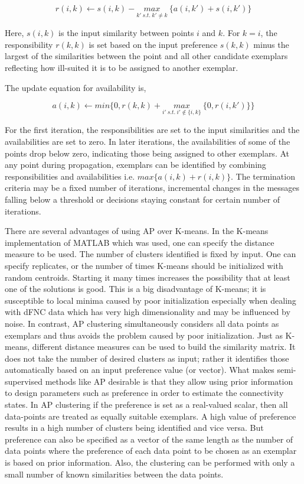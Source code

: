 \documentclass{article}
\begin{document}
\begin{equation}
r(i,k) \leftarrow s(i,k) - \underset{k'\: s.t.\: k'\neq k}{max}\:\{a(i,k')+s(i,k')\}
\end{equation}

Here, $s(i,k)$ is the input similarity between points $i$ and $k$. For $k=i$, the responsibility $r(k,k)$ is set based on the input preference $s(k,k)$ minus the largest of the similarities between the point and all other candidate exemplars reflecting how ill-suited it is to be assigned to another exemplar.

The update equation for availability is,

\begin{equation}
a(i,k) \leftarrow min \{ 0, r(k,k) + \underset{i'\: s.t.\: i'\notin\{i,k\}}{max}\: \{0,r(i,k')\} \}
\end{equation}

For the first iteration, the responsibilities are set to the input similarities and the availabilities are set to zero. In later iterations, the availabilities of some of the points drop below zero, indicating those being assigned to other exemplars. At any point during propagation, exemplars can be identified by combining responsibilities and availabilities i.e. $max\{a(i,k)+r(i,k)\}$. The termination criteria may be a fixed number of iterations, incremental changes in the messages falling below a threshold or decisions staying constant for certain number of iterations.

There are several advantages of using \ac{AP} over K-means. In the K-means implementation of MATLAB which was used, one can specify the distance measure to be used. The number of clusters identified is fixed by input. One can specify replicates, or the number of times K-means should be initialized with random centroids. Starting it many times increases the possibility that at least one of the solutions is good. This is a big disadvantage of K-means; it is susceptible to local minima caused by poor initialization especially when dealing with \ac{dFNC} data which has very high dimensionality and may be influenced by noise. In contrast, \ac{AP} clustering simultaneously considers all data points as exemplars and thus avoids the problem caused by poor initialization. Just as K-means, different distance measures can be used to build the similarity matrix. It does not take the number of desired clusters as input; rather it identifies those automatically based on an input preference value (or vector). What makes semi-supervised methods like \ac{AP} desirable is that they allow using prior information to design parameters such as preference in order to estimate the connectivity states. In \ac{AP} clustering if the preference is set as a real-valued scalar, then all data-points are treated as equally suitable exemplars. A high value of preference results in a high number of clusters being identified and vice versa. But preference can also be specified as a vector of the same length as the number of data points where the preference of each data point to be chosen as an exemplar is based on prior information. Also, the clustering can be performed with only a small number of known similarities between the data points. 
\end{document}
